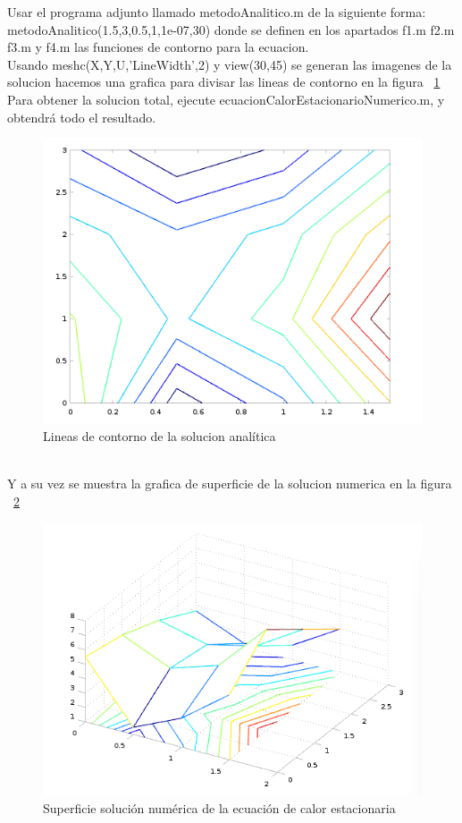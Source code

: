\documentclass[11pt,a4paper]{article}
\begin{document}
Usar el programa adjunto llamado metodoAnalitico.m de la siguiente forma:\\
metodoAnalitico(1.5,3,0.5,1,1e-07,30) donde se definen en los apartados f1.m f2.m f3.m y f4.m las funciones de contorno para la ecuacion.\\
Usando meshc(X,Y,U,'LineWidth',2) y view(30,45) se generan las imagenes de la solucion hacemos una grafica para divisar las lineas de contorno en la figura ~\ref{figura5}\\
Para obtener la solucion total, ejecute ecuacionCalorEstacionarioNumerico.m, y obtendrá todo el resultado.
\begin{figure}[htbp]
\begin{center}
\includegraphics[scale=0.75]{img_Sol_4}
\caption{Lineas de contorno de la solucion analítica}
\label{figura5}
\end{center}
\end{figure}
\\Y a su vez se muestra la grafica de superficie de la solucion numerica en la figura ~\ref{figura6}
\begin{figure}[htbp]
\begin{center}
\includegraphics[scale=0.65]{img_Sol_3}
\caption{Superficie solución numérica de la ecuación de calor estacionaria}
\label{figura6}
\end{center}
\end{figure}
\end{document}
